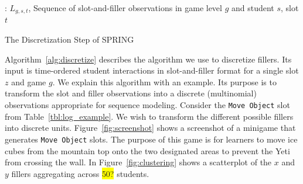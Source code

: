 \documentclass{sigchi}
\newcommand{\hl}[1]{\colorbox{yellow}{#1}}
\def\algname{SPRING\xspace}
\begin{document}
\begin{algorithm}[ht]
	\begin{algorithmic}[1]
		\Require: $L_{g,s,t}$, Sequence of slot-and-filler observations in game level $g$ and student $s$, slot $t$
		
	
		\State
					\EndIf
				\EndFor
		\EndFor
		\State {}
		\EndProcedure
		
	\end{algorithmic}
	\caption{The Discretization Step of \algname \label{alg:discretize}}
\end{algorithm}


Algorithm~\ref{alg:discretize} describes the algorithm we use to discretize fillers.
 Its input is time-ordered student interactions in slot-and-filler format for a single slot $z$ and game $g$.
We explain this algorithm with an example.
Its purpose is to transform the slot and filler observations into a discrete (multinomial) observations appropriate for sequence modeling.
Consider the \texttt{Move Object} slot from Table~\ref{tbl:log_example}.
We wish to transform the different possible fillers into discrete units.
Figure~\ref{fig:screenshot} shows a screenshot of a minigame that generates  \texttt{Move Object} slots.
The purpose of this game is for learners  to move ice cubes from the mountain top onto the two designated areas to prevent the Yeti from crossing the wall.
In Figure~\ref{fig:clustering} shows a scatterplot of the $x$ and $y$ fillers aggregating across \hl{50?} students.
\end{document}
